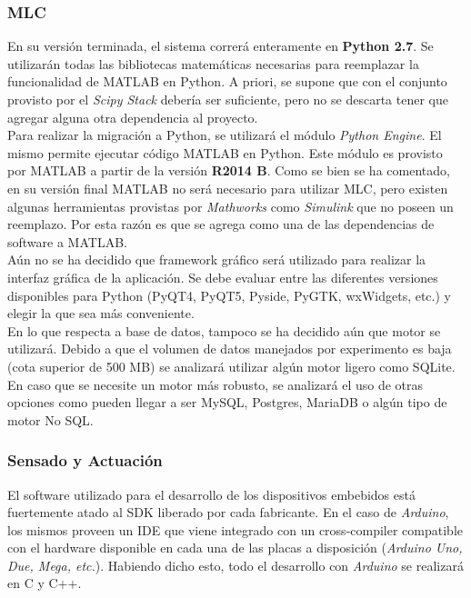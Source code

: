\documentclass[a4paper,10pt]{article}
\begin{document}
    \subsubsection{MLC}
        En su versión terminada, el sistema correrá enteramente en \textbf{Python 2.7}. Se utilizarán todas las bibliotecas matemáticas
        necesarias para reemplazar la funcionalidad de MATLAB en Python. A priori, se supone que con el conjunto provisto por el
        \textit{Scipy Stack} debería ser suficiente, pero no se descarta tener que agregar alguna otra dependencia al proyecto. \\
        \indent Para realizar la migración a Python, se utilizará el módulo \textit{Python Engine}. El mismo permite ejecutar código
        MATLAB en Python. Este módulo es provisto por MATLAB a partir de la versión \textbf{R2014 B}. Como se bien se ha comentado, en su
        versión final MATLAB no será necesario para utilizar MLC, pero existen algunas herramientas provistas por \textit{Mathworks} como
        \textit{Simulink} que no poseen un reemplazo. Por esta razón es que se agrega como una de las dependencias de software a MATLAB. \\
        \indent Aún no se ha decidido que framework gráfico será utilizado para realizar la interfaz gráfica de la aplicación. Se debe
        evaluar entre las diferentes versiones disponibles para Python (PyQT4, PyQT5, Pyside, PyGTK, wxWidgets, etc.) y elegir la que sea
        más conveniente. \\
        \indent En lo que respecta a base de datos, tampoco se ha decidido aún que motor se utilizará. Debido a que el volumen de datos
        manejados por experimento es baja (cota superior de 500 MB) se analizará utilizar algún motor ligero como SQLite. En caso que se
        necesite un motor más robusto, se analizará el uso de otras opciones como pueden llegar a ser MySQL, Postgres, MariaDB o algún tipo
        de motor No SQL.

    \subsubsection{Sensado y Actuación}
        El software utilizado para el desarrollo de los dispositivos embebidos está fuertemente atado al SDK liberado por cada fabricante.
        En el caso de \textit{Arduino}, los mismos proveen un IDE que viene integrado con un cross-compiler compatible con el hardware
        disponible en cada una de las placas a disposición (\textit{Arduino Uno, Due, Mega, etc.}). Habiendo dicho esto, todo el desarrollo
        con \textit{Arduino} se realizará en C y C++.
\end{document}
